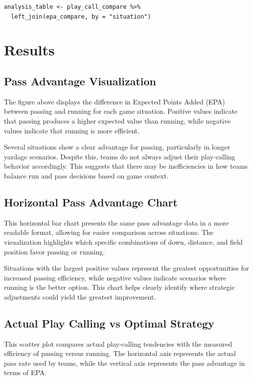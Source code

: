 \documentclass[12pt]{article}
\begin{document}
\begin{lstlisting}
analysis_table <- play_call_compare %>%
  left_join(epa_compare, by = "situation")
\end{lstlisting}

\section{Results}

\subsection{Pass Advantage Visualization}

The figure above displays the difference in Expected Points Added (EPA) between passing and running for each game situation. Positive values indicate that passing produces a higher expected value than running, while negative values indicate that running is more efficient.

Several situations show a clear advantage for passing, particularly in longer yardage scenarios. Despite this, teams do not always adjust their play-calling behavior accordingly. This suggests that there may be inefficiencies in how teams balance run and pass decisions based on game context.

\subsection{Horizontal Pass Advantage Chart}

This horizontal bar chart presents the same pass advantage data in a more readable format, allowing for easier comparison across situations. The visualization highlights which specific combinations of down, distance, and field position favor passing or running.

Situations with the largest positive values represent the greatest opportunities for increased passing efficiency, while negative values indicate scenarios where running is the better option. This chart helps clearly identify where strategic adjustments could yield the greatest improvement.

\subsection{Actual Play Calling vs Optimal Strategy}

This scatter plot compares actual play-calling tendencies with the measured efficiency of passing versus running. The horizontal axis represents the actual pass rate used by teams, while the vertical axis represents the pass advantage in terms of EPA.
\end{document}

